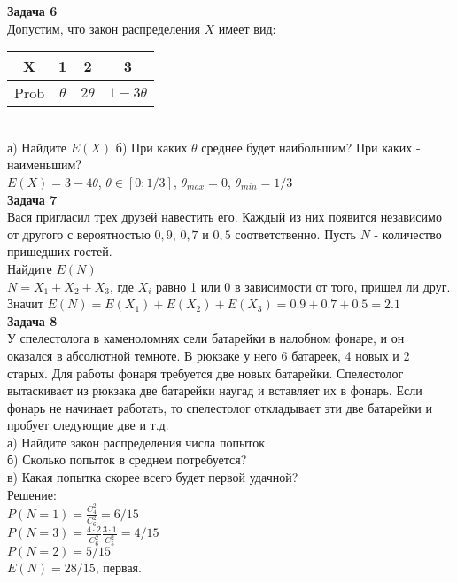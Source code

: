 \documentclass[pdftex,12pt,a4paper]{article}
\begin{document}
\textbf{Задача 6} \\ %
Допустим, что закон распределения $X$ имеет вид:
\begin{tabular}{|c|c|c|c|}
  \hline
  X & 1 & 2 & 3 \\
  \hline
  Prob & $\theta$ & $2\theta$ & $1-3\theta$ \\
  \hline
\end{tabular} \\
а) Найдите $E(X)$ %
б) При каких $\theta$ среднее будет наибольшим? При каких - наименьшим? \\
$E(X)=3-4\theta$, $\theta\in[0;1/3]$, $\theta_{max}=0$, $\theta_{min}=1/3$ \\


\textbf{Задача 7} \\ %
Вася пригласил трех друзей навестить его. Каждый из них появится
независимо от другого с вероятностью $0,9$, $0,7$ и $0,5$
соответственно. Пусть $N$ - количество пришедших гостей. \\
Найдите $E(N)$ \\
$N=X_{1}+X_{2}+X_{3}$, где $X_{i}$ равно 1 или 0 в зависимости от того, пришел ли друг. Значит $E(N)=E(X_{1})+E(X_{2})+E(X_{3})=0.9+0.7+0.5=2.1$ \\


\textbf{Задача 8} \\ %
У спелестолога в каменоломнях сели батарейки в налобном фонаре, и он оказался в абсолютной темноте. В рюкзаке у него 6 батареек, 4 новых и 2 старых. Для работы фонаря требуется две новых батарейки. Спелестолог вытаскивает из рюкзака две батарейки наугад и вставляет их в фонарь. Если фонарь не начинает работать, то спелестолог откладывает эти две батарейки и пробует следующие две и т.д. \\
а) Найдите закон распределения числа попыток \\
б) Сколько попыток в среднем потребуется? \\
в) Какая попытка скорее всего будет первой удачной? \\
Решение: \\
$P(N=1)=\frac{C_{4}^{2}}{C_{6}^{2}}=6/15$ \\
$P(N=3)=\frac{4\cdot 2}{C_{6}^{2}}\frac{3\cdot 1}{C_{5}^{2}}=4/15$\\
$P(N=2)=5/15$ \\
$E(N)=28/15$, первая. \\
\end{document}

